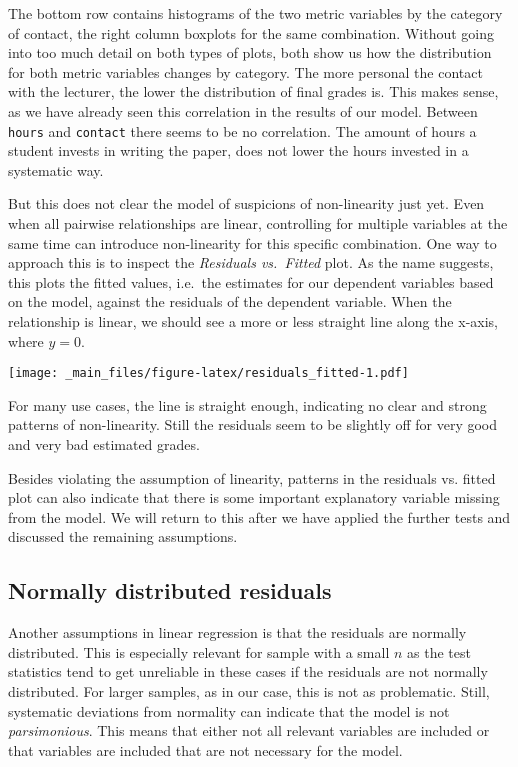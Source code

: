 \documentclass[
]{book}
\begin{document}
The bottom row contains histograms of the two metric variables by the category
of contact, the right column boxplots for the same combination. Without going
into too much detail on both types of plots, both show us how the distribution
for both metric variables changes by category. The more personal the contact
with the lecturer, the lower the distribution of final grades is. This makes
sense, as we have already seen this correlation in the results of our model.
Between \texttt{hours} and \texttt{contact} there seems to be no correlation. The amount of
hours a student invests in writing the paper, does not lower the hours invested
in a systematic way.

But this does not clear the model of suspicions of non-linearity just yet. Even
when all pairwise relationships are linear, controlling for multiple variables
at the same time can introduce non-linearity for this specific combination.
One way to approach this is to inspect the \emph{Residuals vs.~Fitted} plot. As the
name suggests, this plots the fitted values, i.e.~the estimates for our
dependent variables based on the model, against the residuals of the dependent
variable. When the relationship is linear, we should see a more or less straight
line along the x-axis, where \(y = 0\).

\texttt{[image: \_main\_files/figure-latex/residuals\_fitted-1.pdf]}

For many use cases, the line is straight enough, indicating no clear and strong
patterns of non-linearity. Still the residuals seem to be slightly off for very
good and very bad estimated grades.

Besides violating the assumption of linearity, patterns in the residuals vs.
fitted plot can also indicate that there is some important explanatory variable
missing from the model.
We will return to this after we have applied the further tests and
discussed the remaining assumptions.

\hypertarget{normally-distributed-residuals}{%
\subsection{Normally distributed residuals}\label{normally-distributed-residuals}}

Another assumptions in linear regression is that the residuals are normally
distributed. This is especially relevant for sample with a small \(n\) as the
test statistics tend to get unreliable in these cases if the residuals are not
normally distributed. For larger samples, as in our case, this is not as
problematic. Still, systematic deviations from normality can indicate that the
model is not \emph{parsimonious}. This means that either not all relevant variables
are included or that variables are included that are not necessary for the model.
\end{document}
